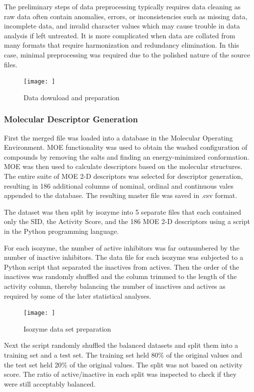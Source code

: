 The preliminary steps of data preprocessing typically requires data cleaning as raw data often contain anomalies, errors, or inconsistencies such as missing data, incomplete data, and invalid character values which may cause trouble in data analysis if left untreated. It is more complicated when data are collated from many formats that require harmonization and redundancy elimination. \cite{Nantasenamat2009} In this case, minimal preprocessing was required due to the polished nature of the source files.


\begin{figure}[h,t]
  \caption{Data download and preparation}
  \centering
   \texttt{[image: ]}
\end{figure}


\subsubsection{Molecular Descriptor Generation}
First the merged file was loaded into a database in the Molecular Operating Environment. MOE functionality was used to obtain the washed configuration of compounds by removing the salts and finding an energy-minimized conformation. MOE was then used to calculate descriptors based on the molecular structures. The entire suite of MOE 2-D descriptors was selected for descriptor generation, resulting in 186 additional columns of nominal, ordinal and continuous vales appended to the database. The resulting master file was saved in .csv format.

The dataset was then split by isozyme into 5 separate files that each contained only the SID, the Activity Score, and the 186 MOE 2-D descriptors using a script in the Python programming language.

For each isozyme, the number of active inhibitors was far outnumbered by the number of inactive inhibitors. The data file for each isozyme was subjected to a Python script that separated the inactives from actives. Then the order of the inactives was randomly shuffled and the column trimmed to the length of the activity column, thereby balancing the number of inactives and actives as required by some of the later statistical analyses. 

\begin{figure}[h,t]
  \caption{Isozyme data set preparation}
  \centering
   \texttt{[image: ]}
\end{figure}

Next the script randomly shuffled the balanced datasets and split them into a training set and a test set. The training set held 80\% of the original values and the test set held 20\% of the original values. The split was not based on activity score. The ratio of active/inactive in each split was inspected to check if they were still acceptably balanced.

